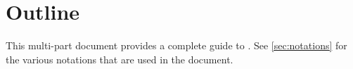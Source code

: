 \section{Outline}

This multi-part document provides a complete guide to \urbi.  See
\autoref{sec:notations} for the various notations that are used in the
document.

\newenvironment{partDescription}[2]
{%
  \item[\autoref{#1} --- \nameref{#1}]~\\%
  #2
  \begin{description}%
    \let\itemOrig\item%
    \renewcommand{\item}[1][]{\itemOrig[~~\autoref{##1} --- \nameref{##1}]~\\}%
  }{%
  \end{description}%
}

\begin{description}




{
  
}

\end{description}


\renewenvironment{partDescription}[2]
{%
  \chapter*{About This Part}
  #2
  \begin{description}%
    \let\itemOrig\item%
    \renewcommand{\item}[1][]{\itemOrig[~~\autoref{##1} --- \nameref{##1}]~\\}%
  }{%
  \end{description}%
}



